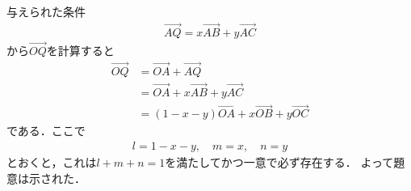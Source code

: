 \documentclass[../../main.tex]{subfiles}
\begin{document}
与えられた条件
\begin{align}
  \overrightarrow{AQ}=x\overrightarrow{AB}+y\overrightarrow{AC}
\end{align}
から$\overrightarrow{OQ}$を計算すると
\begin{align}
  \overrightarrow{OQ}
  &= \overrightarrow{OA} + \overrightarrow{AQ} \\
  &= \overrightarrow{OA} + x\overrightarrow{AB} + y\overrightarrow{AC} \\
  &= (1-x-y)\overrightarrow{OA} + x\overrightarrow{OB} + y\overrightarrow{OC}
\end{align}
である．ここで
\begin{align}
  l = 1 - x - y, \quad
  m = x, \quad
  n = y
\end{align}
とおくと，これは$l+m+n=1$を満たしてかつ一意で必ず存在する．
よって題意は示された．

\newpage
\end{document}
